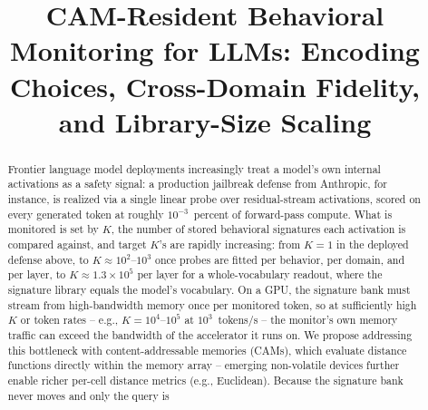 \documentclass[conference]{IEEEtran}
\newcommand{\cam}{{CAM}\xspace}
\begin{document}

\title{\cam-Resident Behavioral Monitoring for LLMs: Encoding Choices,
Cross-Domain Fidelity, and Library-Size Scaling}

\author{
}

\maketitle

\begin{abstract}
Frontier language model deployments increasingly treat a model's own internal
activations as a safety signal: a production jailbreak defense from
Anthropic, for instance, is realized via a single linear probe over residual-stream
activations, scored on every generated token at roughly
$10^{-3}$~percent of forward-pass compute. What is monitored is set by
$K$, the number of stored behavioral signatures each activation is
compared against, and target $K$'s are rapidly increasing: from $K=1$
in the deployed defense above, to $K\!\approx\!10^{2}$--$10^{3}$ once
probes are fitted per behavior, per domain, and per layer, to
$K\!\approx\!1.3\!\times\!10^{5}$ per layer for a whole-vocabulary
readout, where the signature library equals the model's vocabulary. On a GPU,
the signature bank must stream from high-bandwidth memory once per
monitored token, so at sufficiently high $K$ or token rates -- e.g.,
$K=10^{4}$--$10^{5}$ at $10^{3}$~tokens/s -- the monitor's own memory
traffic can exceed the bandwidth of the accelerator it runs
on. We
propose addressing this bottleneck with content-addressable memories
(\cam{}s), which evaluate distance functions directly within the
memory array -- emerging non-volatile devices further enable
richer per-cell distance metrics (e.g., Euclidean). Because the signature bank never moves and only the query is

\end{abstract}
\end{document}
